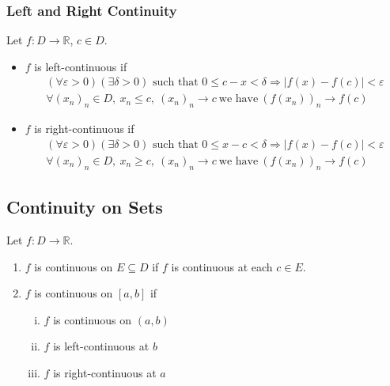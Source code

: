 \documentclass[10pt]{extarticle}
\newcommand{\R}{\mathbb{R}}
\begin{document}
    \subsubsection{Left and Right Continuity}%
    Let $f: D\rightarrow \R$, $c\in D$.
    \begin{itemize}
      \item $f$ is left-continuous if
        \begin{align*}
          (\forall \varepsilon > 0)(\exists \delta > 0) \text{ such that } 0\leq c-x < \delta \Rightarrow |f(x) - f(c)| < \varepsilon\\
          \forall (x_n)_n \in D,~x_n \leq c,~(x_n)_n \rightarrow c~\text{we have}~\left(f(x_n)\right)_n \rightarrow f(c)
        \end{align*}
      \item $f$ is right-continuous if
        \begin{align*}
          (\forall \varepsilon > 0)(\exists \delta > 0) \text{ such that } 0\leq x-c < \delta \Rightarrow |f(x) - f(c)| < \varepsilon\\
          \forall (x_n)_n \in D,~x_n \geq c,~(x_n)_n \rightarrow c~\text{we have}~\left(f(x_n)\right)_n \rightarrow f(c)
        \end{align*}
    \end{itemize}
  \subsection{Continuity on Sets}%
    Let $f: D\rightarrow \R$.
    \begin{enumerate}[(1)]
      \item $f$ is continuous on $E\subseteq D$ if $f$ is continuous at each $c\in E$.
      \item $f$ is continuous on $[a,b]$ if
        \begin{enumerate}[(i)]
          \item $f$ is continuous on $(a,b)$
          \item $f$ is left-continuous at $b$
          \item $f$ is right-continuous at $a$
        \end{enumerate}
    \end{enumerate}
\end{document}
